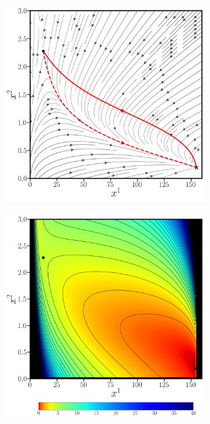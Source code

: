 \begin{figure} 
    \centering
     
    \begin{subfigure}[b]{0.4\textwidth}  
        \centering 
        \includegraphics[width=\textwidth]{figs_part1/pyritz/genetic_switch_instanton.png}
        \caption[]%
        {}    
        \label{fig:genetic switch inst}
    \end{subfigure}
    \hspace{0.4cm}
    \begin{subfigure}[b]{0.4\textwidth}
        \centering
        \includegraphics[width=\textwidth]{figs_part1/pyritz/genetic_switch_quasipotential_from_xb_to_xa.png}

\end{subfigure}
\end{figure}
